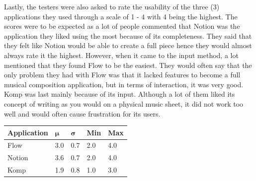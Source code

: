 		Lastly, the testers were also asked to rate the usability of the three (3) applications they used through a scale of 1 - 4 with 4 being the highest. The scores were to be expected as a lot of people commented that Notion was the application they liked using the most because of its completeness. They said that they felt like Notion would be able to create a full piece hence they would almost always rate it the highest. However, when it came to the input method, a lot mentioned that they found Flow to be the easiest. They would often say that the only problem they had with Flow was that it lacked features to become a full musical composition application, but in terms of interaction, it was very good. Komp was last mainly because of its input. Although a lot of them liked its concept of writing as you would on a physical music sheet, it did not work too well and would often cause frustration for its users. 


		\begin{table}[!htpb]
		  \centering
		   \label{tab:app-usability-scores}
		  \begin{tabular}{|p{3cm}|R{1cm}|R{1cm}|R{1cm}|R{1cm}|}
		  	\hline
		  	\textbf{Application} & \begin{math}\bm{\mu}\end{math} & \begin{math}\bm{\sigma}\end{math} & \textbf{Min} & \textbf{Max} \\ \hline

		  	Flow 	& 3.0 & 0.7 & 2.0 & 4.0 \\ \hline
		  	Notion 	& 3.6 & 0.7 & 2.0 & 4.0 \\ \hline 
		  	Komp 	& 1.9 & 0.8 & 1.0 & 3.0 \\ \hline
			
		  \end{tabular}
		\end{table}

	


